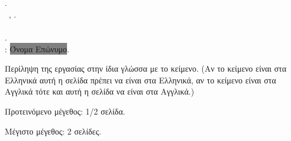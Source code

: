 \chapter*{\abstractname}
\addstarredchapter{\abstractname} %
\makeatletter

\@author.\\
\cseabstracttype\ \cseabstractcs, \@date.\\
\cseabstractdpt\\
\@title.\\
\cseabstractsup: \colorbox{gray}{Όνομα Επώνυμο}.\\
\bigskip

\noindent Περίληψη της εργασίας στην ίδια γλώσσα με το 
κείμενο. (Αν το κείμενο είναι στα Ελληνικά αυτή η σελίδα
πρέπει να είναι στα Ελληνικά, αν το κείμενο είναι στα
Αγγλικά τότε και αυτή η σελίδα να είναι στα Αγγλικά.)

\y\noindent Προτεινόμενο μέγεθος: 1/2 σελίδα.

\y\noindent Μέγιστο μέγεθος: 2 σελίδες.